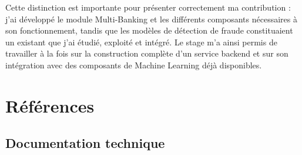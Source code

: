 \documentclass[12pt,a4paper]{extreport}
\begin{document}
Cette distinction est importante pour présenter correctement ma contribution : j'ai développé le module Multi-Banking et les différents composants nécessaires à son fonctionnement, tandis que les modèles de détection de fraude constituaient un existant que j'ai étudié, exploité et intégré. Le stage m'a ainsi permis de travailler à la fois sur la construction complète d'un service backend et sur son intégration avec des composants de Machine Learning déjà disponibles.

\chapter{Références}

\section*{Documentation technique}
\end{document}
